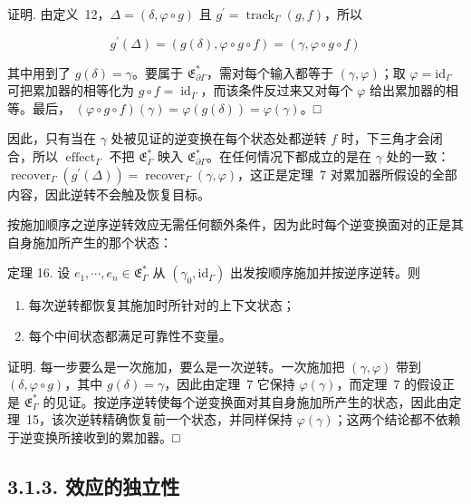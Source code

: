 证明. 由定义~12，\(\Delta = ( \delta , \varphi \circ g )\) 且
\(g ^ { \prime } = \operatorname { t r a c k } _ { \Gamma } ( g , f )\)，所以

\[
g ^ { \prime } ( \Delta ) = ( g ( \delta ) , \varphi \circ g \circ f ) = ( \gamma , \varphi \circ g \circ f )
\]

其中用到了 \(g ( \delta ) = \gamma\)。要属于 \(\mathfrak { E } _ { \partial \Gamma } ^ { * }\)，需对每个输入都等于
\(( \gamma , \varphi )\)；取 \(\varphi = \mathrm { i d } _ { \Gamma }\) 可把累加器的相等化为
\(g \circ f = \operatorname { i d } _ { \Gamma }\)，而该条件反过来又对每个 \(\varphi\) 给出累加器的相等。最后，
\(( \varphi \circ g \circ f ) ( \gamma ) = \varphi ( g ( \delta ) ) = \varphi ( \gamma )\)。□

因此，只有当在 \(\gamma\) 处被见证的逆变换在每个状态处都逆转 \(f\) 时，下三角才会闭合，所以
\(\operatorname { e f f e c t } _ { \Gamma }\) 不把 \(\mathfrak { E } _ { \Gamma } ^ { * }\) 映入
\(\mathfrak { E } _ { \partial \Gamma } ^ { * }\)。在任何情况下都成立的是在 \(\gamma\) 处的一致：
\(\operatorname { r e c o v e r } _ { \Gamma } ( g ^ { \prime } ( \Delta ) ) = \operatorname { r e c o v e r } _ { \Gamma } ( \gamma , \varphi )\)，这正是定理~7 对累加器所假设的全部内容，因此逆转不会触及恢复目标。

按施加顺序之逆序逆转效应无需任何额外条件，因为此时每个逆变换面对的正是其自身施加所产生的那个状态：

定理 16. 设 \(e _ { 1 } , \cdots , e _ { n } \in \mathfrak { E } _ { \Gamma } ^ { * }\) 从
\(( \gamma _ { 0 } , \mathrm { i d } _ { \Gamma } )\) 出发按顺序施加并按逆序逆转。则

\begin{enumerate}
\def\labelenumi{\arabic{enumi}.}
\item
  每次逆转都恢复其施加时所针对的上下文状态；
\item
  每个中间状态都满足可靠性不变量。
\end{enumerate}

证明. 每一步要么是一次施加，要么是一次逆转。一次施加把 \(( \gamma , \varphi )\) 带到
\(( \delta , \varphi \circ g )\)，其中 \(g ( \delta ) = \gamma\)，因此由定理~7 它保持
\(\varphi ( \gamma )\)，而定理~7 的假设正是 \(\mathfrak { E } _ { \Gamma } ^ { * }\) 的见证。按逆序逆转使每个逆变换面对其自身施加所产生的状态，因此由定理~15，该次逆转精确恢复前一个状态，并同样保持
\(\varphi ( \gamma )\)；这两个结论都不依赖于逆变换所接收到的累加器。□

\subsection{3.1.3. 效应的独立性}\label{independence-of-efects}

